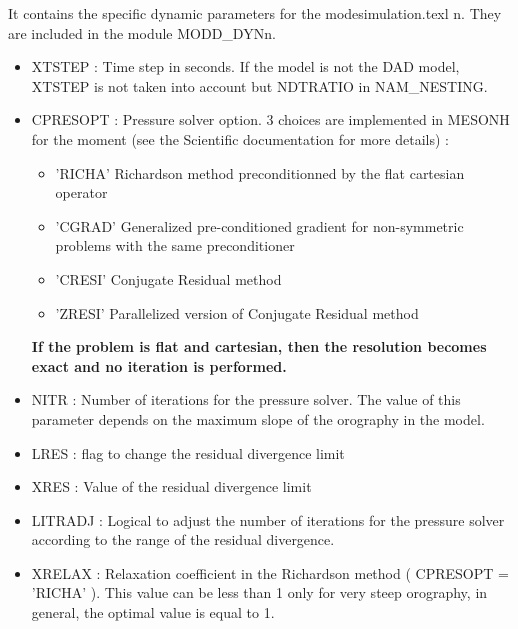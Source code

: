 It contains the specific dynamic parameters  for the modesimulation.texl n. They
are included in the module MODD\_DYNn. 
\begin{itemize}

\item
XTSTEP : Time step in seconds. If the model is not the DAD model,
XTSTEP is not taken into account but NDTRATIO in NAM\_NESTING.

\item
CPRESOPT :
 Pressure solver option. 3 choices are implemented in MESONH for the
moment (see the Scientific documentation for more details) : 

\begin{itemize}
\item 'RICHA' Richardson method preconditionned by the flat cartesian operator   
\item 'CGRAD' Generalized pre-conditioned gradient for non-symmetric problems
 with the same preconditioner
\item 'CRESI' Conjugate Residual method
\item 'ZRESI' Parallelized version of Conjugate Residual method
\end{itemize}
{\bf If the problem is flat and cartesian, then the resolution
becomes exact and no iteration is performed.}

\item 
NITR : Number of iterations for the  pressure solver. The value of this
parameter depends on the maximum slope of the orography  in the model.  

\item 
LRES : flag to change the residual divergence limit

\item 
XRES : Value of the residual divergence limit

\item
LITRADJ : Logical to adjust the number of iterations for the  pressure solver according to the range of the residual divergence. 

\item
{}
XRELAX : Relaxation coefficient in the Richardson method ( CPRESOPT = 'RICHA' ).
This value can be less than 1 only for very steep orography, in general, the
optimal value is equal to 1.



\end{itemize}
